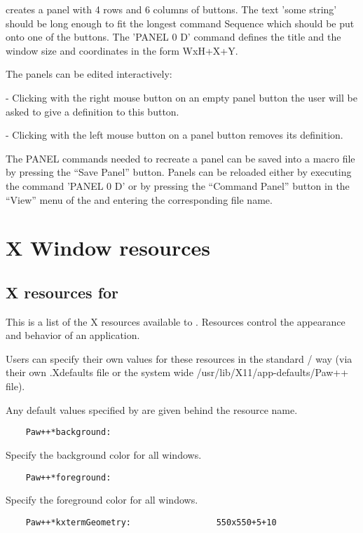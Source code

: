    creates a panel with 4 rows and 6 columns of buttons.  The text 'some
   string' should be long enough to fit the longest command Sequence which
   should be put onto one of the buttons.  The 'PANEL 0 D' command defines the
   title and the window size and coordinates in the form WxH+X+Y.

   The panels can be edited interactively:

   - Clicking with the right mouse button on an empty panel button the user
   will be asked to give a definition to this button.

   - Clicking with the left mouse button on a panel button removes its
   definition.

   The PANEL commands needed to recreate a panel can be saved into a macro
file by pressing the ``Save Panel'' button.  Panels can be reloaded either by
executing the command 'PANEL 0 D' or by pressing the ``Command Panel'' button
   in the ``View'' menu of the \EW{} and entering the corresponding
   file name.



\appendix
\chapter{X Window resources}
\section{X resources for \PAWPP}

   This is a list of the X resources available to \PAWPP.  Resources control
   the appearance and behavior of an application.

   Users can specify their own values for these resources in the standard
   \Xxi/\MOTIF{} way (via their own .Xdefaults file or the system wide
   /usr/lib/X11/app-defaults/Paw++ file).

   Any default values specified by \PAWPP{} are given behind the resource name.

\begin{verbatim}
    Paw++*background:
\end{verbatim}

   Specify the background color for all windows.

\begin{verbatim}
    Paw++*foreground:
\end{verbatim}

   Specify the foreground color for all windows.

\begin{verbatim}
    Paw++*kxtermGeometry:                 550x550+5+10
\end{verbatim}

